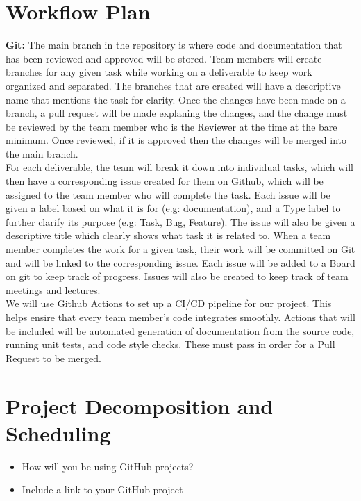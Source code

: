 \documentclass{article}
\begin{document}
\section{Workflow Plan}

{\bf Git:} The main branch in the repository is where code and documentation that has been reviewed and approved will be stored. Team members will create branches for any given task while working
on a deliverable to keep work organized and separated.  The branches that are created will have a descriptive name that mentions the task for clarity. Once the changes have been made on a branch, 
a pull request will be made explaning the changes, and the change must be reviewed by the team member who is the Reviewer at the time at the bare minimum. Once reviewed, if it is approved then the changes will be merged into the main branch. \\

 For each deliverable, the team will break it down into individual tasks, which will then have a corresponding issue created for them on Github, which will be assigned to the team member who will complete the task.
Each issue will be given a label based on what it is for (e.g: documentation), and a Type label to further clarify its purpose (e.g: Task, Bug, Feature). 
The issue will also be given a descriptive title which clearly shows what task it is related to. When a team member completes the work for a given task, their work will
be committed on Git and will be linked to the corresponding issue. Each issue will be added to a Board on git to keep track of progress. Issues will also be created to keep track of team meetings and lectures. \\

 We will use Github Actions to set up a CI/CD pipeline for our project. This helps ensire that every team member's code integrates smoothly. Actions that will be included will be
automated generation of documentation from the source code, running unit tests, and code style checks. These must pass in order for a Pull Request to be merged.
\section{Project Decomposition and Scheduling}

\begin{itemize}
  \item How will you be using GitHub projects?
  \item Include a link to your GitHub project
\end{itemize}
\end{document}
